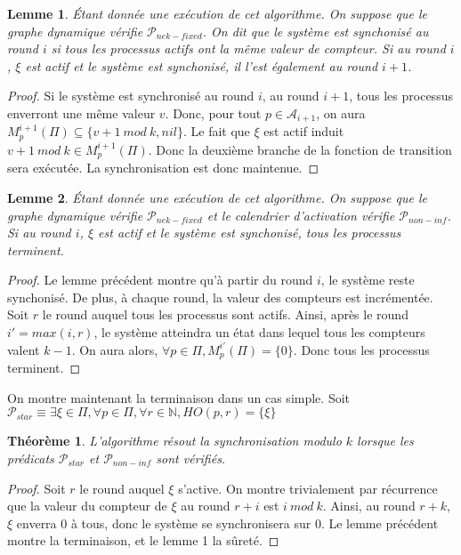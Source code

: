 \documentclass{article}
\newtheorem{lemma}{Lemme}
\newtheorem{theorem}{Théorème}
\begin{document}
\begin{lemma}
	Étant donnée une exécution de cet algorithme. On suppose que le graphe dynamique vérifie $\mathcal{P}_{nek-fixed}$.
	On dit que le système est synchonisé au round $i$ si tous les processus actifs ont la même valeur de compteur.
	Si au round $i$, $\xi$ est actif et le système est synchonisé, il l'est également au round $i+1$.
\end{lemma}
\begin{proof}
	Si le système est synchronisé au round $i$, au round $i+1$, tous les processus enverront une même valeur $v$.
	Donc, pour tout $p \in \mathcal{A}_{i+1}$, on aura $M_p^{i+1}(\Pi) \subseteq \{v+1~mod~k, nil\}$.
	Le fait que $\xi$ est actif induit $v+1~mod~k \in M_p^{i+1}(\Pi)$.
	Donc la deuxième branche de la fonction de transition sera exécutée.
	La synchronisation est donc maintenue.
\end{proof}
\begin{lemma}
	Étant donnée une exécution de cet algorithme. On suppose que le graphe dynamique vérifie $\mathcal{P}_{nek-fixed}$ et le calendrier d'activation vérifie $\mathcal{P}_{non-inf}$.
	Si au round $i$, $\xi$ est actif et le système est synchonisé, tous les processus terminent.
\end{lemma}
\begin{proof}
	Le lemme précédent montre qu'à partir du round $i$, le système reste synchonisé. De plus, à chaque round, la valeur des compteurs est incrémentée.
	Soit $r$ le round auquel tous les processus sont actifs.
	Ainsi, après le round $i' = max(i, r)$, le système atteindra un état dans lequel tous les compteurs valent $k-1$.
	On aura alors, $\forall p \in \Pi, M_p^{i'}(\Pi) = \{0\}$.
	Donc tous les processus terminent.
\end{proof}

On montre maintenant la terminaison dans un cas simple.
Soit $\mathcal{P}_{star} \equiv \exists \xi \in \Pi, \forall p \in \Pi, \forall r \in \mathds{N}, HO(p, r) = \{\xi\}$

\begin{theorem}
	L'algorithme résout la synchronisation modulo $k$ lorsque les prédicats $\mathcal{P}_{star}$ et $\mathcal{P}_{non-inf}$ sont vérifiés.
\end{theorem}
\begin{proof}
	Soit $r$ le round auquel $\xi$ s'active.
	On montre trivialement par récurrence que la valeur du compteur de $\xi$ au round $r+i$ est $i~mod~k$.
	Ainsi, au round $r+k$, $\xi$ enverra $0$ à tous, donc le système se synchronisera sur $0$.
	Le lemme précédent montre la terminaison, et le lemme 1 la sûreté.
\end{proof}
\end{document}
